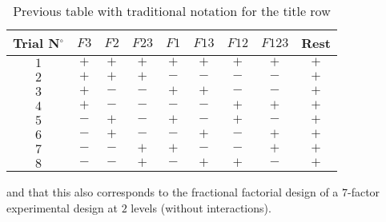	\begin{table}[H]\centering
	\begin{center}
			\begin{tabular}{|c|c|c|c|c|c|c|c|c|}
				\hline
				\multicolumn{1}{c}{\cellcolor{black!30}\textbf{Trial N${}^\circ$}} & 
  \multicolumn{1}{c}{\cellcolor{black!30}$F3$} & 
  \multicolumn{1}{c}{\cellcolor{black!30}$F2$} & 
  \multicolumn{1}{c}{\cellcolor{black!30}$F23$} & 
  \multicolumn{1}{c}{\cellcolor{black!30}$F1$} & 
  \multicolumn{1}{c}{\cellcolor{black!30}$F13$} & 
  \multicolumn{1}{c}{\cellcolor{black!30}$F12$} & 
  \multicolumn{1}{c}{\cellcolor{black!30}$F123$} & \multicolumn{1}{c}{\cellcolor{black!30}\textbf{Rest}} \\ \hline
				$1$ & $+$ & $+$ & $+$ & $+$ & $+$ & $+$ & $+$ & $+$\\ \hline
				$2$ & $+$ & $+$ & $+$ & $-$ & $-$ & $-$ & $-$ & $+$\\ \hline
				$3$ & $+$ & $-$ & $-$ & $+$ & $+$ & $-$ & $-$ & $+$\\ \hline
				$4$ & $+$ & $-$ & $-$ & $-$ & $-$ & $+$ & $+$ & $+$\\ \hline
				$5$ & $-$ & $+$ & $-$ & $+$ & $-$ & $+$ & $-$ & $+$\\ \hline
				$6$ & $-$ & $+$ & $-$ & $-$ & $+$ & $-$ & $+$ & $+$\\ \hline
				$7$ & $-$ & $-$ & $+$ & $+$ & $-$ & $-$ & $+$ & $+$\\ \hline
				$8$ & $-$ & $-$ & $+$ & $-$ & $+$ & $+$ & $-$ & $+$\\ \hline
 		\end{tabular}
	\end{center}
	\caption[]{Previous table with traditional notation for the title row}
	\end{table}
	and that this also corresponds to the fractional factorial design of a $7$-factor experimental design at $2$ levels (without interactions).
	
